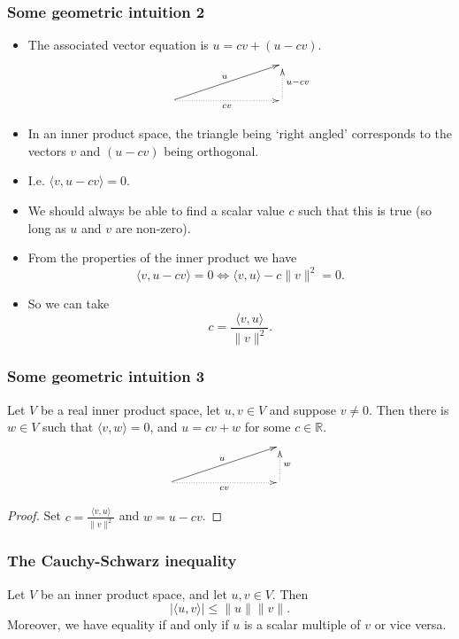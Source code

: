 \documentclass[handout]{beamer}
\newcommand{\bR}{\mathbb{R}}
\begin{document}
\begin{frame}
\frametitle{Some geometric intuition 2}
\begin{itemize}
\item The associated vector equation is $u = cv + (u -cv)$.
\[\xymatrix{ & & & \\
\ar[rrru]^u\ar@{.>}[rrr]_{cv} & & &\ar@{.>}[u]_{u-cv}
}\]

\item In an inner product space, the triangle being `right angled' corresponds to the vectors $v$ and $(u-cv)$ being orthogonal.
\item I.e. $\langle v, u-cv\rangle = 0$. 
\item We should always be able to find a scalar value $c$ such that this is true (so long as $u$ and $v$ are non-zero). 

\item From the properties of the inner product we have
\[\langle v, u-cv\rangle = 0 \iff \langle v, u\rangle - c\|v\|^2 = 0.\]
\item So we can take 
\[c = \frac{\langle v, u \rangle}{\|v\|^2}.\]
\end{itemize}
\end{frame}

\begin{frame}
\frametitle{Some geometric intuition 3}
\begin{lemma}\label{L:LA4orth}
Let $V$ be a real inner product space, let $u,v\in V$ and suppose $v\neq 0$. Then there is $w\in V$ such that $\langle v, w\rangle =0$, and $u = cv + w$ for some $c\in \bR$. 
\[\xymatrix{ & & & \\
\ar[rrru]^u\ar@{.>}[rrr]_{cv} & & &\ar@{.>}[u]_{w}
}\]
\end{lemma}
\begin{proof}
Set $c = \frac{\langle v, u \rangle}{\|v\|^2}$ and $w = u - cv$.
\end{proof}
\end{frame}

\begin{frame}
\frametitle{The Cauchy-Schwarz inequality}
\begin{theorem}
Let $V$ be an inner product space, and let $u,v\in V$. Then
\[|\langle u, v\rangle| \leq\|u\|\|v\|.\]
Moreover, we have equality if and only if $u$ is a scalar multiple of $v$ or vice versa.
\end{theorem}
\end{frame}
\end{document}
